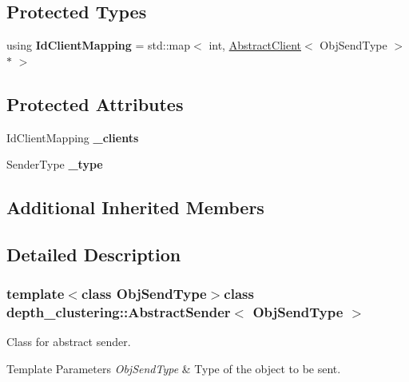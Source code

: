 \subsection*{Protected Types}
\begin{DoxyCompactItemize}
\item 
\hypertarget{classdepth__clustering_1_1AbstractSender_adc736ec9622d4baf520c8379a23e65ab}{using {\bfseries Id\-Client\-Mapping} = std\-::map$<$ int, \hyperlink{classdepth__clustering_1_1AbstractClient}{Abstract\-Client}$<$ Obj\-Send\-Type $>$ $\ast$ $>$}\label{classdepth__clustering_1_1AbstractSender_adc736ec9622d4baf520c8379a23e65ab}

\end{DoxyCompactItemize}
\subsection*{Protected Attributes}
\begin{DoxyCompactItemize}
\item 
\hypertarget{classdepth__clustering_1_1AbstractSender_a5ef5e33f2a4a2821b2eb4285fe85f80e}{Id\-Client\-Mapping {\bfseries \-\_\-clients}}\label{classdepth__clustering_1_1AbstractSender_a5ef5e33f2a4a2821b2eb4285fe85f80e}

\item 
\hypertarget{classdepth__clustering_1_1AbstractSender_a9c837623381f9ec0e26130457286af1a}{Sender\-Type {\bfseries \-\_\-type}}\label{classdepth__clustering_1_1AbstractSender_a9c837623381f9ec0e26130457286af1a}

\end{DoxyCompactItemize}
\subsection*{Additional Inherited Members}


\subsection{Detailed Description}
\subsubsection*{template$<$class Obj\-Send\-Type$>$class depth\-\_\-clustering\-::\-Abstract\-Sender$<$ Obj\-Send\-Type $>$}

Class for abstract sender. 


\begin{DoxyTemplParams}{Template Parameters}
{\em Obj\-Send\-Type} & Type of the object to be sent. \\
\hline
\end{DoxyTemplParams}


